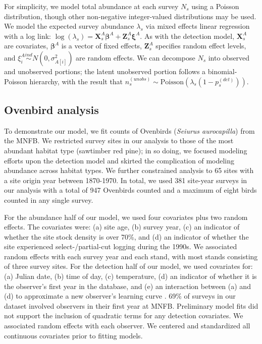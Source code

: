 \documentclass[useAMS,usenatbib,referee,12pt]{article}
\begin{document}
For simplicity, we model total abundance at each survey $N_{s}$ using a Poisson distribution, though other non-negative integer-valued distributions may be used.  
We model the expected survey abundance $\lambda_{s}$ via mixed effects linear regression with a log link: $\log (\lambda_{s}) = \textbf{X}_{s}^A\boldsymbol{\beta}^A + \textbf{Z}_{s}^A\boldsymbol{\xi}^A$.  As with the detection model, $\textbf{X}_{s}^A$ are covariates, $\boldsymbol{\beta}^A$ is a vector of fixed effects, $\textbf{Z}_{s}^A$ specifies random effect levels, and $\xi_i^A \overset{ind}{\sim} N(0,\sigma_{A[i]}^2)$ are random effects.  
We can decompose $N_{s}$ into observed and unobserved portions; the latent unobserved portion follows a binomial-Poisson hierarchy, with the result that $n_{s}^{(unobs)} \sim \mbox{Poisson}\left(\lambda_{s}(1-p_{s}^{(det)})\right)$.  




\subsection{Ovenbird analysis}\label{sec:ovenbirdanalysis}
To demonstrate our model, we fit counts of Ovenbirds (\textit{Seiurus aurocapilla}) from the MNFB.
We restricted survey sites in our analysis to those of the most abundant habitat type (sawtimber red pine); in so doing, we focused modeling efforts upon the detection model and skirted the complication of modeling abundance across habitat types.  
We further constrained analysis to 65 sites with a site origin year between 1870-1970.  
In total, we used 381 site-year surveys in our analysis with a total of 947 Ovenbirds counted and a maximum of eight birds counted in any single survey.

For the abundance half of our model, we used four covariates plus two random effects.  
The covariates were: (a) site age, (b) survey year, (c) an indicator of whether the site stock density is over 70\%, and (d) an indicator of whether the site experienced select-/partial-cut logging during the 1990s.  
We associated random effects with each survey year and each stand, with most stands consisting of three survey sites.  
For the detection half of our model, we used covariates for: (a) Julian date, (b) time of day, (c) temperature, (d) an indicator of whether it is the observer's first year in the database, and (e) an interaction between (a) and (d) to approximate a new observer's learning curve \citep{Alldredge2007}.  
69\% of surveys in our dataset involved observers in their first year at MNFB.  
Preliminary model fits did not support the inclusion of quadratic terms for any detection covariates.  
We associated random effects with each observer.  
We centered and standardized all continuous covariates prior to fitting models.
\end{document}
